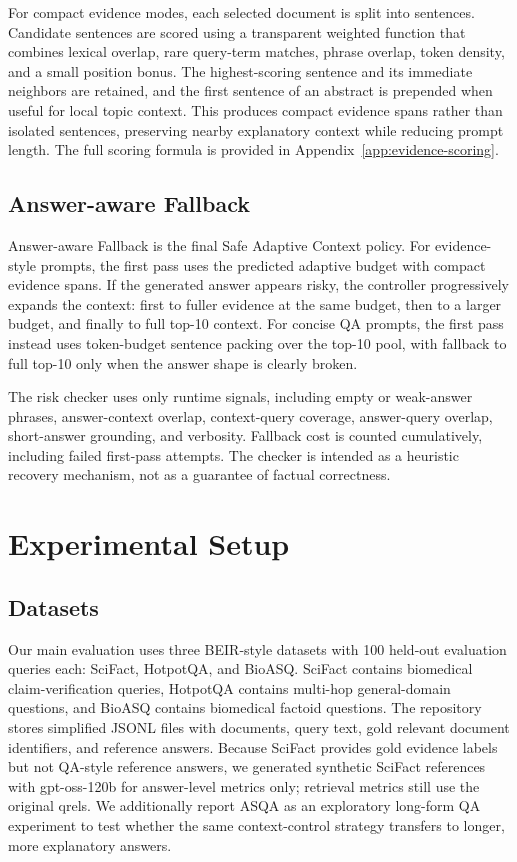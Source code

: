 \documentclass[11pt]{article}
\begin{document}
For compact evidence modes, each selected document is split into sentences. Candidate sentences are scored using a transparent weighted function that combines lexical overlap, rare query-term matches, phrase overlap, token density, and a small position bonus. The highest-scoring sentence and its immediate neighbors are retained, and the first sentence of an abstract is prepended when useful for local topic context. This produces compact evidence spans rather than isolated sentences, preserving nearby explanatory context while reducing prompt length. The full scoring formula is provided in Appendix~\ref{app:evidence-scoring}.


\subsection{Answer-aware Fallback}

Answer-aware Fallback is the final Safe Adaptive Context policy. For evidence-style prompts, the first pass uses the predicted adaptive budget with compact evidence spans. If the generated answer appears risky, the controller progressively expands the context: first to fuller evidence at the same budget, then to a larger budget, and finally to full top-10 context. For concise QA prompts, the first pass instead uses token-budget sentence packing over the top-10 pool, with fallback to full top-10 only when the answer shape is clearly broken.


The risk checker uses only runtime signals, including empty or weak-answer phrases, answer-context overlap, context-query coverage, answer-query overlap, short-answer grounding, and verbosity. Fallback cost is counted cumulatively, including failed first-pass attempts. The checker is intended as a heuristic recovery mechanism, not as a guarantee of factual correctness.


\section{Experimental Setup}

\subsection{Datasets}

Our main evaluation uses three BEIR-style datasets with 100 held-out evaluation queries each: SciFact, HotpotQA, and BioASQ. SciFact contains biomedical claim-verification queries, HotpotQA contains multi-hop general-domain questions, and BioASQ contains biomedical factoid questions. The repository stores simplified JSONL files with documents, query text, gold relevant document identifiers, and reference answers. Because SciFact provides gold evidence labels but not QA-style reference answers, we generated synthetic SciFact references with gpt-oss-120b for answer-level metrics only; retrieval metrics still use the original qrels. We additionally report ASQA as an exploratory long-form QA experiment to test whether the same context-control strategy transfers to longer, more explanatory answers.
\end{document}
